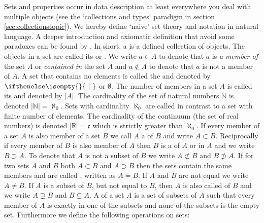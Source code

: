Sets and properties occur in data description at least everywhere you deal with
multiple objects (see the `collections and types` paradigm in section
\ref{sec:collectionstopic}).  We hereby define `naive' set theory and notation
in natural language.  A deeper introduction and axiomatic definition that avoid
some paradoxes can be found by \textcite{Jech2003}.  In short, a  is
a defined collection of objects. The objects in a set are called its
 or .  We write
$a \in A$ to denote that $a$ is \emph{a member of} the set $A$ or
\emph{contained in} the set $A$ and $a \notin A$ to denote that $a$ is not a
member of $A$. A set that contains no elements is called the  and
denoted by $\set{}$ or $\emptyset$. The number of members in a set $A$ is
called its  and denoted by $|A|$. The cardinality of the set
of natural numbers $\mathbb{N}$ is denoted $|\mathbb{N}| = \aleph_0$.  Sets
with cardinality $\aleph_0$ are called  in contrast to
a  set with finite number of elements.  The cardinality
of the continuum (the set of real numbers) is denoted
$|\mathbb{R}|=\mathfrak{c}$ which is strictly greater than $\aleph_0$.  If
every member of a set $A$ is also member of a set $B$ we call $A$ a
 of $B$ and write $A \subset B$. Reciprocally if every member of
$B$ is also member of $A$ then $B$ is a  of $A$ or
 in $A$ and we write $B \supset A$. To denote
that $A$ is not a subset of $B$ we write $A \not\subset B$ and $B \not\supset
A$. If for two sets $A$ and $B$ both $A \subset B$ and $A \supset B$ then the
sets contain the same members and are called ,
written as $A = B$. If $A$ and $B$ are not equal we write $A \neq B$. If $A$ is
a subset of $B$, but not equal to $B$, then $A$ is also called
 of $B$ and we write $A \supsetneq B$ and $B
\subsetneq A$. A  of a set $A$ is a set of
subsets of $A$ such that every member of $A$ is exactly in one of the subsets
and none of the subsets is the empty set. Furthermore we define the following
operations on sets:

